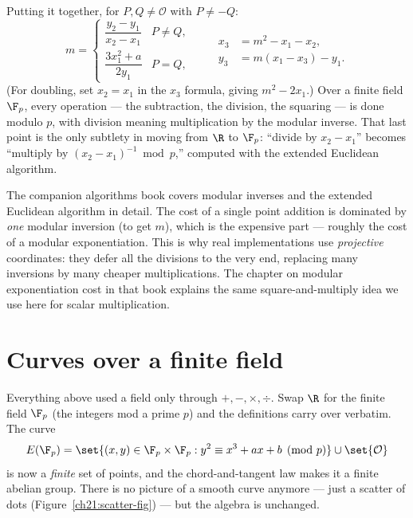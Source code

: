 \begin{formalbox}
Putting it together, for $P,Q \neq \mathcal{O}$ with $P \neq -Q$:
\[
m = \begin{cases}
\dfrac{y_2-y_1}{x_2-x_1} & P \neq Q,\\[1.2em]
\dfrac{3x_1^2+a}{2y_1} & P = Q,
\end{cases}
\qquad
\begin{aligned}
x_3 &= m^2 - x_1 - x_2,\\
y_3 &= m(x_1 - x_3) - y_1.
\end{aligned}
\]
(For doubling, set $x_2 = x_1$ in the $x_3$ formula, giving $m^2 - 2x_1$.) Over a finite
field $\F_p$, every operation --- the subtraction, the division, the squaring --- is
done modulo $p$, with division meaning multiplication by the modular inverse. That last
point is the only subtlety in moving from $\R$ to $\F_p$: ``divide by $x_2-x_1$'' becomes
``multiply by $(x_2-x_1)^{-1} \bmod p$,'' computed with the extended Euclidean algorithm.
\end{formalbox}

\begin{connectionbox}
The companion algorithms book covers modular inverses and the extended Euclidean
algorithm in detail. The cost of a single point addition is dominated by \emph{one}
modular inversion (to get $m$), which is the expensive part --- roughly the cost of a
modular exponentiation. This is why real implementations use \emph{projective}
coordinates: they defer all the divisions to the very end, replacing many inversions by
many cheaper multiplications. The chapter on modular exponentiation cost in that book
explains the same square-and-multiply idea we use here for scalar multiplication.
\end{connectionbox}

\section{Curves over a finite field}
\label{ch21:finitefield}

Everything above used a field only through $+,-,\times,\div$. Swap $\R$ for the finite
field $\F_p$ (the integers mod a prime $p$) and the definitions carry over verbatim. The
curve
\[
E(\F_p) = \set{(x,y) \in \F_p \times \F_p : y^2 \equiv x^3 + ax + b \pmod p} \cup \set{\mathcal{O}}
\]
is now a \emph{finite} set of points, and the chord-and-tangent law makes it a finite
abelian group. There is no picture of a smooth curve anymore --- just a scatter of dots
(Figure~\ref{ch21:scatter-fig}) --- but the algebra is unchanged.

